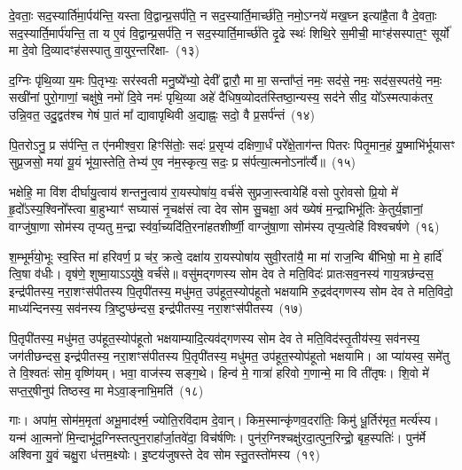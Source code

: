 दे॒वताः॒ सद॒स्यार्ति॑मा॒र्पय॑न्ति॒ यस्ता वि॒द्वान्प्र॒सर्प॑ति॒ न सद॒स्यार्ति॒मार्च्छ॑ति॒ नमो॒\-ऽग्नये॑ मख॒घ्न इत्या॑है॒ता वै दे॒वताः॒ सद॒स्यार्ति॒मार्प॑यन्ति॒ ता य ए॒वं वि॒द्वान्प्र॒सर्प॑ति॒ न सद॒स्यार्ति॒मार्च्छ॑ति दृ॒ढे स्थः॑ शिथि॒रे स॒मीची॒ माꣳह॑सस्पात॒ꣳ॒ सूर्यो॑ मा दे॒वो दि॒व्यादꣳह॑सस्पातु वा॒युर॒न्तरि॑क्षा-~(१३)\ip

द॒ग्निः पृ॑थि॒व्या य॒मः पि॒तृभ्यः॒ सर॑स्वती मनु॒ष्ये᳚भ्यो॒ देवी᳚ द्वारौ॒ मा मा॒ सन्ता᳚प्तं॒ नमः॒ सद॑से॒ नमः॒ सद॑स॒स्पत॑ये॒ नमः॒ सखी॑नां पुरो॒गाणां॒ चक्षु॑षे॒ नमो॑ दि॒वे नमः॑ पृथि॒व्या अहे॑ दैधिष॒व्योदत॑स्तिष्ठा॒न्यस्य॒ सद॑ने सीद॒ यो᳚\-ऽस्मत्पाक॑तर॒ उन्नि॒वत॒ उदु॒द्वत॑श्च गेषं पा॒तं मा᳚ द्यावा\-पृथिवी अ॒द्याह्नः॒ सदो॒ वै प्र॒सर्प॑न्तं~(१४)\ip

पि॒तरो\-ऽनु॒ प्र स॑र्पन्ति॒ त ए॑नमीश्व॒रा हिꣳसि॑तोः॒ सदः॑ प्र॒सृप्य॑ दक्षिणा॒र्धं परे᳚क्षे॒ताग॑न्त पितरः पितृ॒मान॒हं यु॒ष्माभि॑र्भूयासꣳ सुप्र॒जसो॒ मया॑ यू॒यं भू॑या॒स्तेति॒ तेभ्य॑ ए॒व न॑म॒स्कृत्य॒ सदः॒ प्र स॑र्पत्या॒त्मनो\-ऽना᳚र्त्यै॥~(१५)\ip

{\anuvakamend[{म॒खो वा अ॒न्तरि॑क्षात्प्र॒सर्प॑न्त॒न्त्रय॑स्त्रिꣳशच्च}]}

भक्षेहि॒ मा वि॑श दीर्घायु॒त्वाय॑ शन्तनु॒त्वाय॑ रा॒यस्पोषा॑य॒ वर्च॑से सुप्रजा॒स्त्वायेहि॑ वसो पुरोवसो प्रि॒यो मे॑ हृ॒दो᳚\-ऽस्य॒श्विनो᳚स्त्वा बा॒हुभ्याꣳ॑ सघ्यासं नृ॒चक्ष॑सं त्वा देव सोम सु॒चक्षा॒ अव॑ ख्येषं म॒न्द्राभिभू॑तिः के॒तुर्य॒ज्ञानां॒ वाग्जु॑षा॒णा सोम॑स्य तृप्यतु म॒न्द्रा स्व॑र्वा॒च्यदि॑ति॒रना॑हतशीर्ष्णी॒ वाग्जु॑षा॒णा सोम॑स्य तृप्य॒त्वेहि॑ विश्वचर्\mbox{}षणे~(१६)\ip

श॒म्भूर्म॑यो॒भूः स्व॒स्ति मा॑ हरिवर्ण॒ प्र च॑र॒ क्रत्वे॒ दक्षा॑य रा॒यस्पोषा॑य सुवी॒रता॑यै॒ मा मा॑ राज॒न्वि बी॑भिषो॒ मा मे॒ हार्दि॑ त्वि॒षा व॑धीः। वृष॑णे॒ शुष्मा॒या\-ऽऽ\-यु॑षे॒ वर्च॑से॥ वसु॑मद्गणस्य सोम देव ते मति॒विदः॑ प्रातःसव॒नस्य॑ गाय॒त्रछ॑न्दस॒ इन्द्र॑पीतस्य॒ नरा॒शꣳस॑पीतस्य पि॒तृपी॑तस्य॒ मधु॑मत॒ उप॑हूत॒स्योप॑हूतो भक्षयामि रु॒द्रव॑द्गणस्य सोम देव ते मति॒विदो॒ माध्य॑न्दिनस्य॒ सव॑नस्य त्रि॒ष्टुप्छ॑न्दस॒ इन्द्र॑पीतस्य॒ नरा॒शꣳस॑पीतस्य~(१७)\ip

पि॒तृपी॑तस्य॒ मधु॑मत॒ उप॑हूत॒स्योप॑हूतो भक्षयाम्यादि॒त्यव॑द्गणस्य सोम देव ते मति॒विद॑स्तृ॒तीय॑स्य॒ सव॑नस्य॒ जग॑तीछन्दस॒ इन्द्र॑पीतस्य॒ नरा॒शꣳस॑पीतस्य पि॒तृपी॑तस्य॒ मधु॑मत॒ उप॑हूत॒स्योप॑हूतो भक्षयामि। आ प्या॑यस्व॒ समे॑तु ते वि॒श्वतः॑ सोम॒ वृष्णि॑यम्। भवा॒ वाज॑स्य सङ्ग॒थे। हिन्व॑ मे॒ गात्रा॑ हरिवो ग॒णान्मे॒ मा वि ती॑तृषः। शि॒वो मे॑ सप्त॒र्॒\mbox{}षीनुप॑ तिष्ठस्व॒ मा मे\-ऽवा॒ङ्नाभि॒मति॑~(१८)\ip

गाः। अपा॑म॒ सोम॑म॒मृता॑ अभू॒माद॑र्श्म॒ ज्योति॒रवि॑दाम दे॒वान्। किम॒स्मान्कृ॑णव॒दरा॑तिः॒ किमु॑ धू॒र्तिर॑मृत॒ मर्त्य॑स्य। यन्म॑ आ॒त्मनो॑ मि॒न्दाभू॑द॒ग्निस्तत्पुन॒राहा᳚र्जा॒तवे॑दा॒ विच॑र्\mbox{}षणिः। पुन॑र॒ग्निश्चक्षु॑रदा॒त्पुन॒रिन्द्रो॒ बृह॒स्पतिः॑। पुन॑र्मे अश्विना यु॒वं चक्षु॒रा ध॑त्तम॒क्ष्योः। इ॒ष्टय॑जुषस्ते देव सोम स्तु॒तस्तो॑मस्य~(१९)\ip

